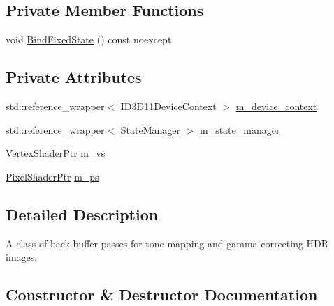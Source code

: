 \subsection*{Private Member Functions}
\begin{DoxyCompactItemize}
\item 
void \hyperlink{classmage_1_1rendering_1_1_back_buffer_pass_a45aafe0681a6e0598d088dbf3954cfb7}{Bind\+Fixed\+State} () const noexcept
\end{DoxyCompactItemize}
\subsection*{Private Attributes}
\begin{DoxyCompactItemize}
\item 
std\+::reference\+\_\+wrapper$<$ I\+D3\+D11\+Device\+Context $>$ \hyperlink{classmage_1_1rendering_1_1_back_buffer_pass_ae87c0cf8b2ffe627ac44faaf61791b4f}{m\+\_\+device\+\_\+context}
\item 
std\+::reference\+\_\+wrapper$<$ \hyperlink{classmage_1_1rendering_1_1_state_manager}{State\+Manager} $>$ \hyperlink{classmage_1_1rendering_1_1_back_buffer_pass_a5d10a44c5f8a3529d64aabfb590156f2}{m\+\_\+state\+\_\+manager}
\item 
\hyperlink{namespacemage_1_1rendering_aaf704b9c54a4181f4950a1761de69dda}{Vertex\+Shader\+Ptr} \hyperlink{classmage_1_1rendering_1_1_back_buffer_pass_a12a95cc800090a0bc01d14a9f5903748}{m\+\_\+vs}
\item 
\hyperlink{namespacemage_1_1rendering_af03d922b228ee9c8542baaa2ecc9f259}{Pixel\+Shader\+Ptr} \hyperlink{classmage_1_1rendering_1_1_back_buffer_pass_a46bc7e8b3636db2eb84b42590b7bd51e}{m\+\_\+ps}
\end{DoxyCompactItemize}


\subsection{Detailed Description}
A class of back buffer passes for tone mapping and gamma correcting H\+DR images. 

\subsection{Constructor \& Destructor Documentation}
\hypertarget{classmage_1_1rendering_1_1_back_buffer_pass_a054aad27e4b3d05baf235ae256934ef2}{}\label{classmage_1_1rendering_1_1_back_buffer_pass_a054aad27e4b3d05baf235ae256934ef2} 
